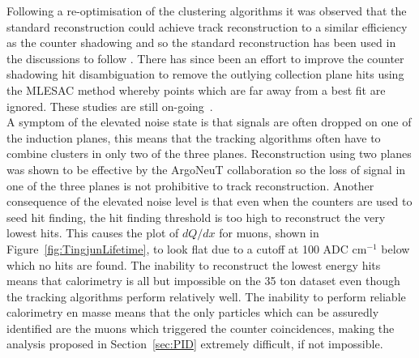 Following a re-optimisation of the clustering algorithms it was observed that the standard reconstruction could achieve track reconstruction to a similar efficiency as the counter shadowing and so the standard reconstruction has been used in the discussions to follow \citep{TingjunClustering}. There has since been an effort to improve the counter shadowing hit disambiguation to remove the outlying collection plane hits using the MLESAC method \citep{MLESAC} whereby points which are far away from a best fit are ignored. These studies are still on-going~\citep{MattMLESAC}. \\

A symptom of the elevated noise state is that signals are often dropped on one of the induction planes, this means that the tracking algorithms often have to combine clusters in only two of the three planes. Reconstruction using two planes was shown to be effective by the ArgoNeuT collaboration \citep{ArgoNeuT} so the loss of signal in one of the three planes is not prohibitive to track reconstruction. Another consequence of the elevated noise level is that even when the counters are used to seed hit finding, the hit finding threshold is too high to reconstruct the very lowest hits. This causes the plot of $dQ/dx$ for muons, shown in Figure~\ref{fig:TingjunLifetime}, to look flat due to a cutoff at 100 ADC cm$^{-1}$ below which no hits are found. The inability to reconstruct the lowest energy hits means that calorimetry is all but impossible on the 35 ton dataset even though the tracking algorithms perform relatively well. The inability to perform reliable calorimetry en masse means that the only particles which can be assuredly identified are the muons which triggered the counter coincidences, making the analysis proposed in Section~\ref{sec:PID} extremely difficult, if not impossible. \\

